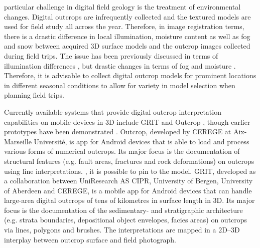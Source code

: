 \documentclass[review]{elsarticle}
\begin{document}

 particular challenge in digital field geology is the treatment of environmental changes. Digital outcrops are infrequently collected and the textured models are used for field study all across the year. Therefore, in image registration terms, there is a drastic difference in local illumination, moisture content as well as fog and snow between acquired 3D surface models and the outcrop images collected during field trips. The issue has been previously discussed in terms of illumination differences \cite{Kehl2017_PHOR}, but drastic changes in terms of fog and moisture . Therefore, it is advisable to collect digital outcrop models for prominent locations in different seasonal conditions to allow for variety in model selection when planning  field trips.

Currently available systems that provide digital outcrop interpretation capabilities on mobile devices in 3D include \gls{GRIT} \cite{Kehl2016_VGCabstract} and Outcrop \cite{Viseur2014_VGCabstract}, though earlier prototypes have been demonstrated \cite{Hama2013}. Outcrop, developed by \gls{CEREGE} at Aix-Marseille Universit\'{e}, is  app for Android devices that is able to load and process various forms of numerical outcrops. Its major focus is the documentation of structural features (e.g. fault areas, fractures and rock deformations) on outcrops using line interpretations. , it is possible to pin  to  the model. \gls{GRIT}, developed as a collaboration between UniResearch AS CIPR, University of Bergen, University of Aberdeen and \gls{CEREGE}, is a mobile app for Android devices that can handle large-area digital outcrops of tens of kilometres in surface length in 3D. Its major focus is the documentation of the sedimentary- and stratigraphic architecture (e.g. strata boundaries, depositional object envelopes, facies areas) on outcrops via lines, polygons and brushes. The interpretations are mapped in a 2D--3D interplay between outcrop surface and field photograph.
\end{document}
